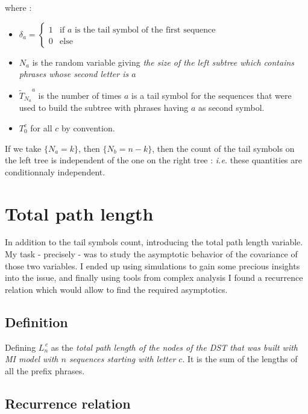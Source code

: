 where :
\begin{itemize}
  \item $\delta_a = 
            \begin{cases} 
                1 & \text{if $a$ is the tail symbol of the
                          first sequence}\\
                0 & \text{else} 
              \end{cases}$

  \item $N_a$ is the 
random variable giving \emph{the size of the left subtree 
which contains phrases whose second letter is $a$}

  \item ${{\tilde T}_{N_a}}^a$ is the number of 
times $a$ is a tail symbol for the sequences that were 
used to  build the subtree with phrases having $a$ as second
symbol.

  \item $T_0^c$ for all $c$ by convention.
\end{itemize}

If we take
$\{ N_a = k \}$, then $\{ N_b = n - k \}$, then
the count of the tail symbols on the left tree 
is independent of the one on the right tree :
\textit{i.e.} these quantities are conditionnaly independent.

\section{ Total path length }

In addition to the tail symbols count, introducing the
total path length variable. My task - precisely - was 
to study the asymptotic behavior of the covariance of those 
two variables. I ended up using simulations to gain some precious
insights into the issue, and finally using tools from complex
analysis I found a recurrence relation which would allow 
to find the required asymptotics.

\subsection{ Definition }

Defining \emph{\bfseries $L_n^{\,c}$} as the \emph{total 
path length of the nodes of the DST that was built with
MI model with $n$ sequences starting with letter $c$}.
It is the sum of the lengths of all the prefix phrases.

\subsection{ Recurrence relation }

